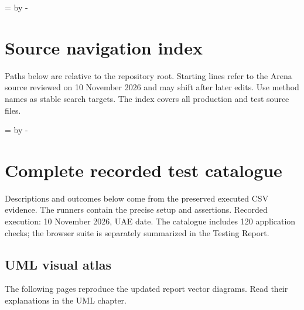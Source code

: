 \documentclass[12pt]{article}
\newcommand{\topic}[1]{\needroom{9\baselineskip}\section{#1}}
\newcommand{\needroom}[1]{\par\begingroup\dimen0=\pagegoal\advance\dimen0 by -\pagetotal\ifdim\dimen0<#1\newpage\fi\endgroup}
\begin{document}
\clearpage\appendix
\topic{Source navigation index}
Paths below are relative to the repository root. Starting lines refer to the Arena source reviewed on 10 November 2026 and may shift after later edits. Use method names as stable search targets. The index covers all production and test source files.


\clearpage\topic{Complete recorded test catalogue}
Descriptions and outcomes below come from the preserved executed CSV evidence. The runners contain the precise setup and assertions. Recorded execution: 10 November 2026, UAE date. The catalogue includes 120 application checks; the browser suite is separately summarized in the Testing Report.


\begin{landscape}
\section{UML visual atlas}
The following pages reproduce the updated report vector diagrams. Read their explanations in the UML chapter.

\end{landscape}
\end{document}
